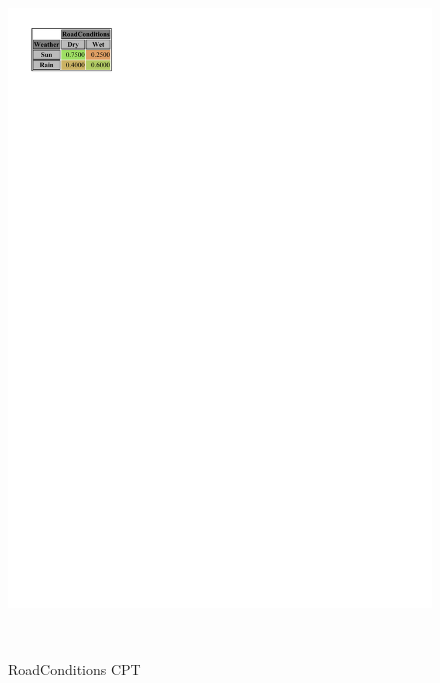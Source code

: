 \documentclass[a4paper,12pt]{article} %
\begin{document}
\begin{figure}[H]
\begin{center}
\begin{minipage}[c]{.31\textwidth}
		\includegraphics[width=.9\linewidth]{../code/roadconditions.pdf}	
		\caption*{RoadConditions CPT}
		\label{fig:roadconditions}
	\end{minipage}
	~
	\begin{minipage}[c]{.35\textwidth}
		\centering
		

\end{minipage}
\end{center}
\end{figure}
\end{document}
